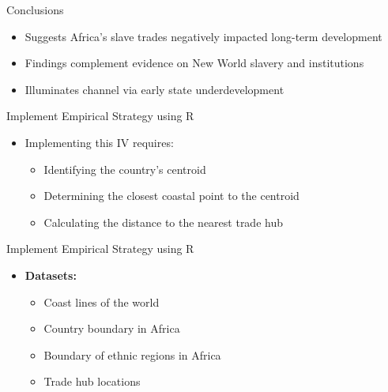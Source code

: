 \documentclass[dvipsnames,hyperref={pdfpagelabels=false}]{beamer}
\begin{document}
\begin{frame}{Conclusions}

\begin{itemize}
\item Suggests Africa's slave trades negatively impacted long-term development
	\vspace{0.2cm}
\item Findings complement evidence on New World slavery and institutions
	\vspace{0.2cm}
\item Illuminates channel via early state underdevelopment
\end{itemize}

\end{frame}




\begin{frame}{Implement Empirical Strategy using R}
		\begin{itemize}
		\item Implementing this IV requires:
			\vspace{0.2cm}
		\begin{itemize}
			\item Identifying the country's centroid
				\vspace{0.2cm}
			\item Determining the closest coastal point to the centroid
				\vspace{0.2cm}
			\item Calculating the distance to the nearest trade hub
		\end{itemize}
	\end{itemize}
	
\end{frame}


\begin{frame}{Implement Empirical Strategy using R}
\begin{itemize}
\item \textbf{Datasets:}
				\vspace{0.2cm}
\begin{itemize}
	\item Coast lines of the world
					\vspace{0.2cm}
	\item Country boundary in Africa
					\vspace{0.2cm}
	\item Boundary of ethnic regions in Africa
					\vspace{0.2cm}
	\item Trade hub locations
\end{itemize}
\end{itemize}
\end{frame}
\end{document}

